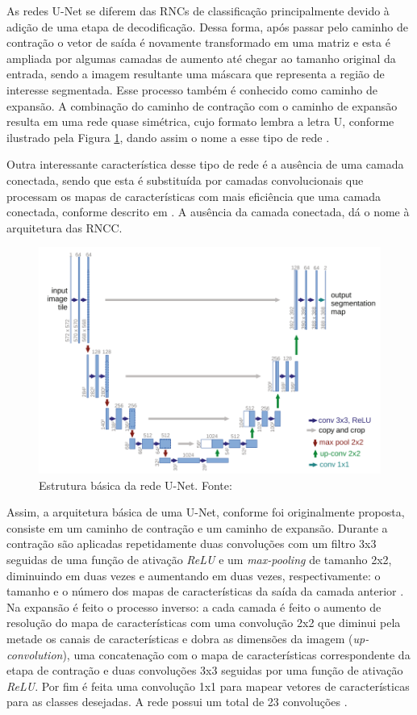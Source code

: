 As redes U-Net se diferem das \ac{RNC}s de classificação principalmente devido à adição de uma etapa de decodificação. Dessa forma, após passar pelo caminho de contração o vetor de saída é novamente transformado em uma matriz e esta é ampliada por algumas camadas de aumento até chegar ao tamanho original da entrada, sendo a imagem resultante uma máscara que representa a região de interesse segmentada. Esse processo também é conhecido como caminho de expansão. A combinação do caminho de contração com o caminho de expansão resulta em uma rede quase simétrica, cujo formato lembra a letra U, conforme ilustrado pela Figura \ref{fig:u-net-example}, dando assim o nome a esse tipo de rede \cite{ronneberger2015u}.

Outra interessante característica desse tipo de rede é a ausência de uma camada conectada, sendo que esta é substituída por camadas convolucionais que processam os mapas de características com mais eficiência que uma camada conectada, conforme descrito em \cite{long2015fully}. A ausência da camada conectada, dá o nome à arquitetura das \ac{RNCC}.

\begin{figure}
  \centering
  \includegraphics[width=.75\linewidth]{figures/2_theoric_foundamentations/u-net-example.png}
  \caption[Estrutura básica da rede U-Net.]{Estrutura básica da rede U-Net. Fonte: \cite{ronneberger2015u}}
  \label{fig:u-net-example}
\end{figure}

Assim, a arquitetura básica de uma U-Net, conforme foi originalmente proposta, consiste em um caminho de contração e um caminho de expansão. Durante a contração são aplicadas repetidamente duas convoluções com um filtro 3x3 seguidas de uma função de ativação \textit{ReLU} e um \textit{max-pooling} de tamanho 2x2, diminuindo em duas vezes e aumentando em duas vezes, respectivamente: o tamanho e o número dos mapas de características da saída da camada anterior \cite{siddique2021u}. 
Na expansão é feito o processo inverso: a cada camada é feito o aumento de resolução do mapa de características com uma convolução 2x2 que diminui pela metade os canais de características e dobra as dimensões da imagem (\textit{up-convolution}), uma concatenação com o mapa de características correspondente da etapa de contração e duas convoluções 3x3 seguidas por uma função de ativação \textit{ReLU}. Por fim é feita uma convolução 1x1 para mapear vetores de características para as classes desejadas. A rede possui um total de 23 convoluções \cite{ronneberger2015u}.

